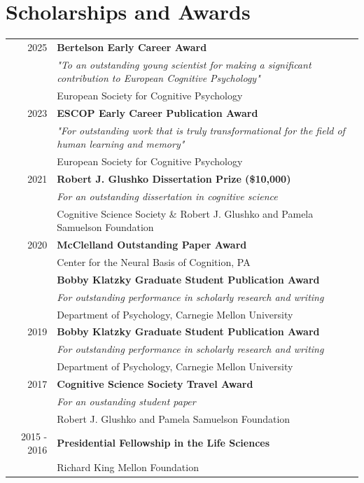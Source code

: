 \documentclass[letterpaper]{article}
\begin{document}
\section*{Scholarships and Awards}
\begin{longtable}{rl}
	2025 & \textbf{Bertelson Early Career Award}\\
    & {\it "To an outstanding young scientist for making a significant contribution to European Cognitive Psychology"} \\
	& European Society for Cognitive Psychology\\[6pt]
    
    2023 & \textbf{ESCOP Early Career Publication Award}\\
	& {\it "For outstanding work that is truly transformational for the field of human learning and memory"}\\
	& European Society for Cognitive Psychology\\[6pt]
	2021 & \textbf{Robert J. Glushko Dissertation Prize (\$10,000)}\\
	& {\it For an outstanding dissertation in cognitive science}\\
	& Cognitive Science Society \& Robert J. Glushko and Pamela Samuelson Foundation\\[6pt]
	2020 & \textbf{McClelland Outstanding Paper Award}\\
	& Center for the Neural Basis of Cognition, PA\\[6pt]
	& \textbf{Bobby Klatzky Graduate Student Publication Award}\\
	& {\it For outstanding performance in scholarly research and writing}\\
	& Department of Psychology, Carnegie Mellon University \\[6pt]
	2019 & \textbf{Bobby Klatzky Graduate Student Publication Award}\\
	& {\it For outstanding performance in scholarly research and writing}\\
	& Department of Psychology, Carnegie Mellon University \\[6pt]
	2017 & \textbf{Cognitive Science Society Travel Award} \\
	&   {\it For an oustanding student paper}\\
	& Robert J. Glushko and Pamela Samuelson Foundation\\[6pt]
	2015 - 2016 & \textbf{Presidential Fellowship in the Life Sciences}\\
	& Richard King Mellon Foundation\\[6pt]

\end{longtable}
\end{document}

